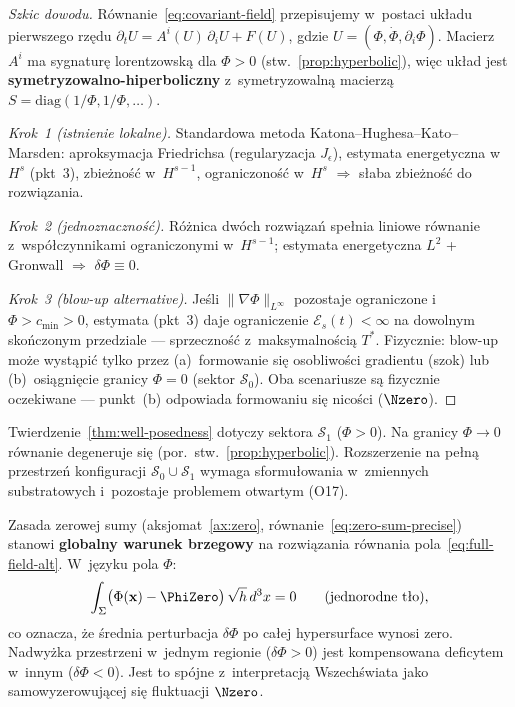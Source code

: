 \begin{proof}[Szkic dowodu]
R\'ownanie~\eqref{eq:covariant-field} przepisujemy w~postaci
uk\l{}adu pierwszego rz\k{e}du $\partial_t U = A^i(U)\,\partial_i U + F(U)$,
gdzie $U = (\Phi, \dot\Phi, \partial_i\Phi)$. Macierz $A^i$ ma
sygnatur\k{e} lorentzowsk\k{a} dla $\Phi > 0$
(stw.~\ref{prop:hyperbolic}), wi\k{e}c uk\l{}ad jest
\textbf{symetryzowalno-hiperboliczny} z~symetryzowaln\k{a}
macierz\k{a} $S = \mathrm{diag}(1/\Phi, 1/\Phi, \ldots)$.

\smallskip\noindent
\emph{Krok~1 (istnienie lokalne).}
Standardowa metoda Katona--Hughesa--Kato--Marsden:
aproksymacja Friedrichsa (regularyzacja $J_\epsilon$),
estymata energetyczna w~$H^s$ (pkt~3), zbie\.zno\'s\'c
w~$H^{s-1}$, ograniczono\'s\'c w~$H^s$ $\Rightarrow$
s\l{}aba zbie\.zno\'s\'c do rozwi\k{a}zania.

\smallskip\noindent
\emph{Krok~2 (jednoznaczno\'s\'c).}
R\'o\.znica dw\'och rozwi\k{a}za\'n spe\l{}nia liniowe
r\'ownanie z~wsp\'o\l{}czynnikami ograniczonymi w~$H^{s-1}$;
estymata energetyczna $L^2$ + Gronwall $\Rightarrow$
$\delta\Phi \equiv 0$.

\smallskip\noindent
\emph{Krok~3 (blow-up alternative).}
Je\'sli $\|\nabla\Phi\|_{L^\infty}$ pozostaje ograniczone
i~$\Phi > c_{\min} > 0$, estymata (pkt~3) daje ograniczenie
$\mathcal{E}_s(t) < \infty$ na dowolnym sko\'nczonym przedziale
--- sprzeczno\'s\'c z~maksymalno\'sci\k{a} $T^*$.
Fizycznie: blow-up mo\.ze wyst\k{a}pi\'c tylko przez (a)~formowanie
si\k{e} osobliwo\'sci gradientu (szok) lub (b)~osi\k{a}gni\k{e}cie
granicy $\Phi = 0$ (sektor $\mathcal{S}_0$). Oba
scenariusze s\k{a} fizycznie oczekiwane --- punkt~(b) odpowiada
formowaniu si\k{e} nico\'sci ($\Nzero$).
\end{proof}

\begin{remark}\label{rem:wp-limitations}
Twierdzenie~\ref{thm:well-posedness} dotyczy sektora $\mathcal{S}_1$
($\Phi > 0$). Na granicy $\Phi \to 0$ r\'ownanie degeneruje
si\k{e} (por.\ stw.~\ref{prop:hyperbolic}). Rozszerzenie
na pe\l{}n\k{a} przestrze\'n konfiguracji
$\mathcal{S}_0 \cup \mathcal{S}_1$ wymaga sformu\l{}owania
w~zmiennych substratowych i~pozostaje problemem otwartym (O17).
\end{remark}

\begin{remark}\label{rem:zero-field}
Zasada zerowej sumy (aksjomat~\ref{ax:zero},
r\'ownanie~\ref{eq:zero-sum-precise}) stanowi \textbf{globalny
warunek brzegowy} na rozwi\k{a}zania r\'ownania
pola~\eqref{eq:full-field-alt}. W~j\k{e}zyku pola $\Phi$:
\begin{equation}\label{eq:zero-constraint}
    \int_\Sigma \bigl(\Phi(\mathbf{x}) - \PhiZero\bigr)\,
    \sqrt{h}\,d^3x = 0
    \qquad\text{(jednorodne t\l{}o)},
\end{equation}
co oznacza, \.ze \'srednia perturbacja $\delta\Phi$ po ca\l{}ej
hypersurface wynosi zero. Nadwy\.zka przestrzeni w~jednym
regionie ($\delta\Phi > 0$) jest kompensowana deficytem
w~innym ($\delta\Phi < 0$). Jest to sp\'ojne
z~interpretacj\k{a} Wszech\'swiata jako samowyzerowuj\k{a}cej
si\k{e} fluktuacji $\Nzero$.
\end{remark}

